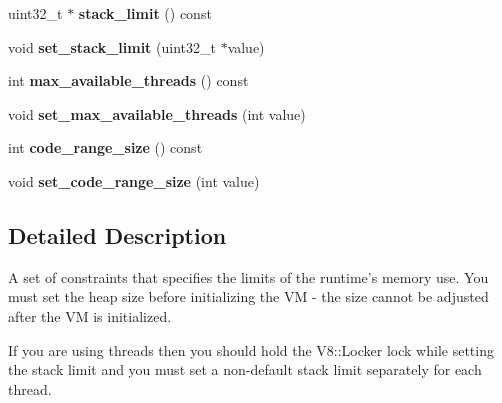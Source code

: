 \begin{DoxyCompactItemize}
\item 
\hypertarget{classv8_1_1ResourceConstraints_aafc4a94f2eeb0684e7a50f355eb4d06d}{uint32\-\_\-t $\ast$ {\bfseries stack\-\_\-limit} () const }\label{classv8_1_1ResourceConstraints_aafc4a94f2eeb0684e7a50f355eb4d06d}

\item 
\hypertarget{classv8_1_1ResourceConstraints_a26ed3e89985a4afe34e84509fb093cf1}{void {\bfseries set\-\_\-stack\-\_\-limit} (uint32\-\_\-t $\ast$value)}\label{classv8_1_1ResourceConstraints_a26ed3e89985a4afe34e84509fb093cf1}

\item 
\hypertarget{classv8_1_1ResourceConstraints_a27a36f0bacb800468d3574f738d12436}{int {\bfseries max\-\_\-available\-\_\-threads} () const }\label{classv8_1_1ResourceConstraints_a27a36f0bacb800468d3574f738d12436}

\item 
\hypertarget{classv8_1_1ResourceConstraints_a1bec2735c94ff50bfbd54bd70f004b72}{void {\bfseries set\-\_\-max\-\_\-available\-\_\-threads} (int value)}\label{classv8_1_1ResourceConstraints_a1bec2735c94ff50bfbd54bd70f004b72}

\item 
\hypertarget{classv8_1_1ResourceConstraints_a91c28dde0404a85822bbdbc3d77ed01b}{int {\bfseries code\-\_\-range\-\_\-size} () const }\label{classv8_1_1ResourceConstraints_a91c28dde0404a85822bbdbc3d77ed01b}

\item 
\hypertarget{classv8_1_1ResourceConstraints_a4f13be58a17eaa391480f19cfc0b8cb5}{void {\bfseries set\-\_\-code\-\_\-range\-\_\-size} (int value)}\label{classv8_1_1ResourceConstraints_a4f13be58a17eaa391480f19cfc0b8cb5}

\end{DoxyCompactItemize}


\subsection{Detailed Description}
A set of constraints that specifies the limits of the runtime's memory use. You must set the heap size before initializing the V\-M -\/ the size cannot be adjusted after the V\-M is initialized.

If you are using threads then you should hold the V8\-::\-Locker lock while setting the stack limit and you must set a non-\/default stack limit separately for each thread. 

